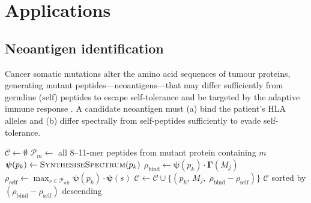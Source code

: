 \section{Applications}
\label{im:sec:applications}

\subsection{Neoantigen identification}
\label{im:sec:neoantigen}

Cancer somatic mutations alter the amino acid sequences of tumour proteins,
generating mutant peptides---neoantigens---that may differ sufficiently from
germline (self) peptides to escape self-tolerance and be targeted by the
adaptive immune response \citep{schumacher2015}. A candidate neoantigen must
(a) bind the patient's HLA alleles and (b) differ spectrally from self-peptides
sufficiently to evade self-tolerance.

\begin{algorithm}
\caption{Neoantigen identification}
\label{im:alg:neoantigen}
\begin{algorithmic}[1]
\State $\mathcal{C} \gets \emptyset$
  \State $\mathcal{P}_m \gets$ all 8--11-mer peptides from mutant protein
    containing $m$
    \State $\bm{\psi}(p_k) \gets \textsc{SynthesiseSpectrum}(p_k)$
      \hfill{}
      \State $\rho_{\mathrm{bind}} \gets \bm{\psi}(p_k)\cdot\bm{\Gamma}(M_j)$
      \State $\rho_{\mathrm{self}} \gets \max_{s\in\mathcal{P}_{\mathrm{self}}}
        \bm{\psi}(p_k)\cdot\bm{\psi}(s)$
        \State $\mathcal{C} \gets \mathcal{C} \cup
          \{(p_k,\, M_j,\; \rho_{\mathrm{bind}} - \rho_{\mathrm{self}})\}$
      \EndIf
    \EndFor
  \EndFor
\EndFor
\State \Return $\mathcal{C}$ sorted by $(\rho_{\mathrm{bind}} - \rho_{\mathrm{self}})$
  descending
\end{algorithmic}
\end{algorithm}

